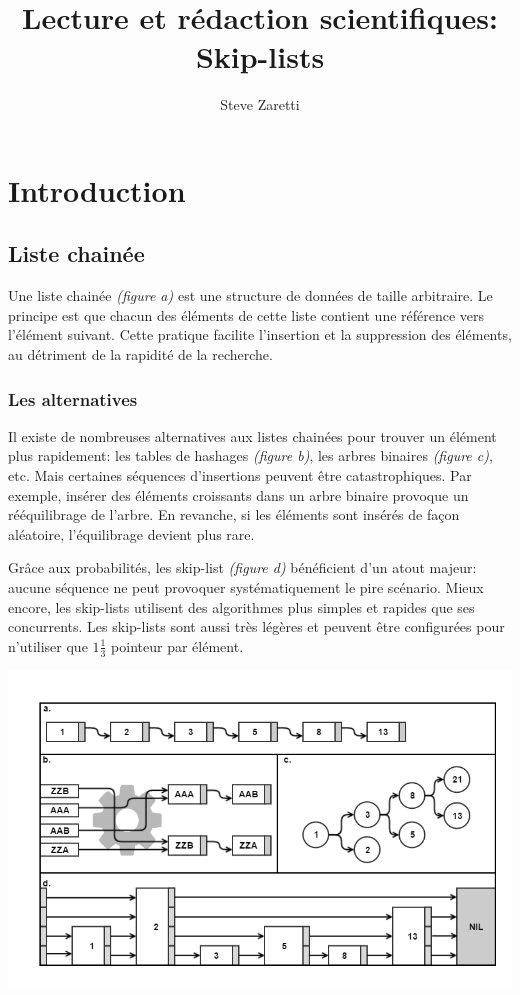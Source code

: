 \documentclass[hidelinks,a4paper, 12pt]{article}
\title{Lecture et rédaction scientifiques: \\Skip-lists }
\author{Steve Zaretti}
\begin{document}
	
	\maketitle
	\newpage
	\tableofcontents
	\newpage
	
	\section{Introduction}
	\subsection{Liste chainée}
	Une liste chainée \textit{(figure a)} est une structure de données de taille arbitraire. Le principe est que chacun des éléments de cette liste contient une référence vers l'élément suivant. Cette pratique facilite l'insertion et la suppression des éléments, au détriment de la rapidité de la recherche.
	
	\subsubsection*{Les alternatives}
	Il existe de nombreuses alternatives aux listes chainées pour trouver un élément plus rapidement: les tables de hashages \textit{(figure b)}, les arbres binaires \textit{(figure c)}, etc. Mais certaines séquences d'insertions peuvent être catastrophiques. Par exemple, insérer des éléments croissants dans un arbre binaire provoque un rééquilibrage de l'arbre. En revanche, si les éléments sont insérés de façon aléatoire, l'équilibrage devient plus rare.

	Grâce aux probabilités, les \og skip-list \fg{} \textit{(figure d)} bénéficient d'un atout majeur: aucune séquence ne peut provoquer systématiquement le pire scénario. Mieux encore, les skip-lists utilisent des algorithmes plus simples et rapides que ses concurrents. Les skip-lists sont aussi très légères et peuvent être configurées pour n'utiliser que $1\frac{1}{3}$ pointeur par élément.
	
	\begin{center}
		\includegraphics[width=\textwidth]{img/datastructure}
	\end{center}
	
\end{document}
